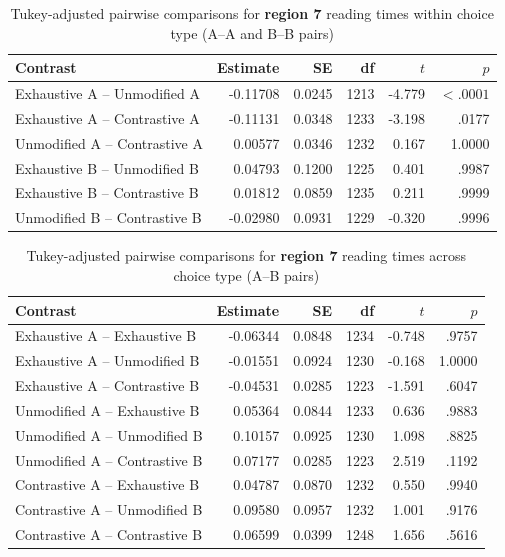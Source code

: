 \documentclass[a4paper, ruler]{CUP-JNL-LIN}%
\begin{document}
\begin{table}[htbp]
\centering
\caption{Tukey-adjusted pairwise comparisons for \textbf{region 7} reading times within choice type (A--A and B--B pairs)}
\label{tab:r7-pairwise-within-choice}
\begin{tabularx}{\textwidth}{@{}Xrrrrr@{}}
\toprule
Contrast & Estimate & SE & df & $t$ & $p$ \\
\midrule
Exhaustive A -- Unmodified A   & -0.11708 & 0.0245 & 1213 & -4.779 & $< .0001$ \\
Exhaustive A -- Contrastive A  & -0.11131 & 0.0348 & 1233 & -3.198 & .0177 \\
Unmodified A -- Contrastive A  &  0.00577 & 0.0346 & 1232 &  0.167 & 1.0000 \\
Exhaustive B -- Unmodified B   &  0.04793 & 0.1200 & 1225 &  0.401 & .9987 \\
Exhaustive B -- Contrastive B  &  0.01812 & 0.0859 & 1235 &  0.211 & .9999 \\
Unmodified B -- Contrastive B  & -0.02980 & 0.0931 & 1229 & -0.320 & .9996 \\
\bottomrule
\end{tabularx}
\end{table}

\begin{table}[htbp]
\centering
\caption{Tukey-adjusted pairwise comparisons for \textbf{region 7} reading times across choice type (A--B pairs)}
\label{tab:r7-pairwise-across-choice}
\begin{tabularx}{\textwidth}{@{}Xrrrrr@{}}
\toprule
Contrast & Estimate & SE & df & $t$ & $p$ \\
\midrule
Exhaustive A -- Exhaustive B   & -0.06344 & 0.0848 & 1234 & -0.748 & .9757 \\
Exhaustive A -- Unmodified B   & -0.01551 & 0.0924 & 1230 & -0.168 & 1.0000 \\
Exhaustive A -- Contrastive B  & -0.04531 & 0.0285 & 1223 & -1.591 & .6047 \\
Unmodified A -- Exhaustive B   &  0.05364 & 0.0844 & 1233 &  0.636 & .9883 \\
Unmodified A -- Unmodified B   &  0.10157 & 0.0925 & 1230 &  1.098 & .8825 \\
Unmodified A -- Contrastive B  &  0.07177 & 0.0285 & 1223 &  2.519 & .1192 \\
Contrastive A -- Exhaustive B  &  0.04787 & 0.0870 & 1232 &  0.550 & .9940 \\
Contrastive A -- Unmodified B  &  0.09580 & 0.0957 & 1232 &  1.001 & .9176 \\
Contrastive A -- Contrastive B &  0.06599 & 0.0399 & 1248 &  1.656 & .5616 \\
\bottomrule
\end{tabularx}
\end{table}
\end{document}
